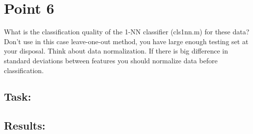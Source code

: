 \documentclass[
  a4paper,            %
  DIV=10,             %
  oneside,            %
  BCOR=5mm,           %
  parskip=half,       %
  numbers=noenddot,   %
  bibtotoc,           %
  listof=totoc        %
]{scrreprt}
\begin{document}
\section*{Point 6}
What is the classification quality of the 1-NN classifier (cls1nn.m) for these data?
\\
Don't use in this case leave-one-out method, you have large enough testing set at your disposal.
Think about data normalization.
If there is big difference in standard deviations between features you should normalize data before classification.
\subsection*{Task:}
\subsection*{Results:}
\end{document}
